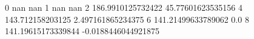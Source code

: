0 nan nan
1 nan nan
2 186.9910125732422 45.77601623535156
4 143.712158203125 2.497161865234375
6 141.21499633789062 0.0
8 141.19615173339844 -0.0188446044921875
